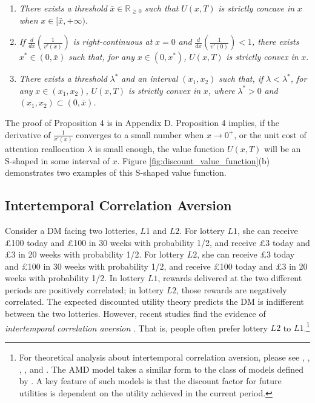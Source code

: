 \documentclass[
  12pt,
]{article}
\begin{document}
\begin{enumerate}
\def\labelenumi{(\alph{enumi})}
\item
  \emph{There exists a threshold} \(\bar{x} \in\mathbb{R}_{\geq0}\)
  \emph{such that} \(U(x,T)\) \emph{is strictly concave in} \(x\)
  \emph{when} \(x\in [\bar{x},+\infty)\).
\item
  \emph{If} \(\frac{d}{dx}\left(\frac{1}{v'(x)}\right)\) \emph{is
  right-continuous at} \(x=0\) \emph{and}
  \(\frac{d}{dx}\left(\frac{1}{v'(0)}\right)<1\)\emph{, there exists}
  \(x^*\in(0, \bar{x})\) \emph{such that, for any}
  \(x\in (0,x^*)\)\emph{,} \(U(x,T)\) \emph{is strictly convex in}
  \(x\).
\item
  \emph{There exists a threshold} \(\lambda^*\) \emph{and an interval}
  \((x_1,x_2)\) \emph{such that, if} \(\lambda<\lambda^*\)\emph{, for
  any} \(x\in(x_1,x_2)\)\emph{,} \(U(x,T)\) \emph{is strictly convex in}
  \(x\)\emph{, where} \(\lambda^*>0\) \emph{and}
  \((x_1,x_2)\subset(0,\bar{x})\)\emph{.}
\end{enumerate}

The proof of Proposition 4 is in Appendix D. Proposition 4 implies, if
the derivative of \(\frac{1}{v'(x)}\) converges to a small number when
\(x\rightarrow 0^+\), or the unit cost of attention reallocation
\(\lambda\) is small enough, the value function \(U(x,T)\) will be an
S-shaped in some interval of \(x\). Figure
\ref{fig:discount_value_function}(b) demonstrates two examples of this
S-shaped value function.

\hypertarget{intertemporal-correlation-aversion}{%
\subsection{Intertemporal Correlation
Aversion}\label{intertemporal-correlation-aversion}}

Consider a DM facing two lotteries, \(L1\) and \(L2\). For lottery
\(L1\), she can receive £100 today and £100 in 30 weeks with probability
1/2, and receive £3 today and £3 in 20 weeks with probability 1/2. For
lottery \(L2\), she can receive £3 today and £100 in 30 weeks with
probability 1/2, and receive £100 today and £3 in 20 weeks with
probability 1/2. In lottery \(L1\), rewards delivered at the two
different periods are positively correlated; in lottery \(L2\), those
rewards are negatively correlated. The expected discounted utility
theory predicts the DM is indifferent between the two lotteries.
However, recent studies find the evidence of \emph{intertemporal
correlation aversion}
\citep{andersen2018multiattribute, rohde2023intertemporal}. That is,
people often prefer lottery \(L2\) to \(L1\).\footnote{For theoretical
  analysis about intertemporal correlation aversion, please see
  \citet{epstein1983stationary}, \citet{epstein1989substitution},
  \citet{weil1990nonexpected}, \citet{bommier2005risk}, and
  \citet{bommier2017monotone}. The AMD model takes a similar form to the
  class of models defined by \citet{epstein1983stationary}. A key
  feature of such models is that the discount factor for future
  utilities is dependent on the utility achieved in the current period.}
\end{document}
